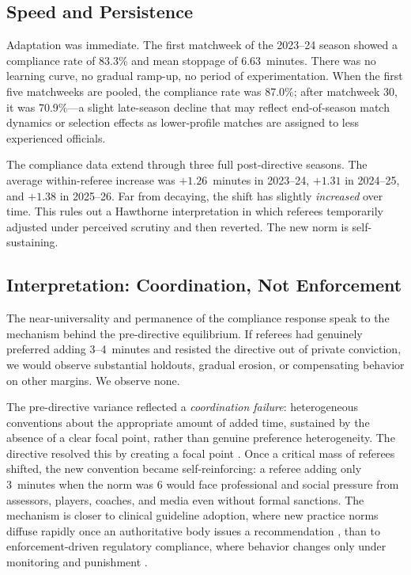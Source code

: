 \subsection{Speed and Persistence}
\label{subsec:persistence}

Adaptation was immediate. The first matchweek of the 2023--24 season
showed a compliance rate of 83.3\% and mean stoppage of 6.63~minutes.
There was no learning curve, no gradual ramp-up, no period of
experimentation. When the first five matchweeks are pooled, the
compliance rate was 87.0\%; after matchweek 30, it was 70.9\%---a
slight late-season decline that may reflect end-of-season match dynamics
or selection effects as lower-profile matches are assigned to less
experienced officials.

The compliance data extend through three full post-directive seasons.
The average within-referee increase was $+1.26$~minutes in 2023--24,
$+1.31$ in 2024--25, and $+1.38$ in 2025--26. Far from decaying, the
shift has slightly \textit{increased} over time. This rules out a
Hawthorne interpretation in which referees temporarily adjusted under
perceived scrutiny and then reverted. The new norm is self-sustaining.


\subsection{Interpretation: Coordination, Not Enforcement}
\label{subsec:compliance_interp}

The near-universality and permanence of the compliance response speak
to the mechanism behind the pre-directive equilibrium. If referees had
genuinely preferred adding 3--4~minutes and resisted the directive out
of private conviction, we would observe substantial holdouts, gradual
erosion, or compensating behavior on other margins. We observe none.

The pre-directive variance reflected a \textit{coordination failure}:
heterogeneous conventions about the appropriate amount of added time,
sustained by the absence of a clear focal point, rather than genuine
preference heterogeneity. The directive resolved this by creating a
focal point \citep{rothockenfels2002}. Once a critical mass of
referees shifted, the new convention became self-reinforcing: a referee
adding only 3~minutes when the norm was 6 would face professional and
social pressure from assessors, players, coaches, and media even
without formal sanctions. The mechanism is closer to clinical guideline
adoption, where new practice norms diffuse rapidly once an authoritative
body issues a recommendation \citep{cabana1999compliance}, than to
enforcement-driven regulatory compliance, where behavior changes only
under monitoring and punishment \citep{duflo2013truth}.

